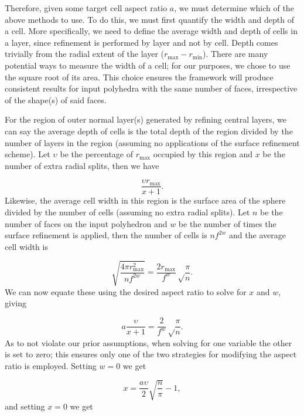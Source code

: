 Therefore, given some target cell aspect ratio $a$, we must determine which of the above methods to use.
To do this, we must first quantify the width and depth of a cell.
More specifically, we need to define the average width and depth of cells in a layer, since refinement is performed by layer and not by cell.
Depth comes trivially from the radial extent of the layer ($r_\mathrm{max} - r_\mathrm{min}$).
There are many potential ways to measure the width of a cell; for our purposes, we chose to use the square root of its area.
This choice ensures the framework will produce consistent results for input polyhedra with the same number of faces, irrespective of the shape(s) of said faces.


For the region of outer normal layer(s) generated by refining central layers, we can say the average depth of cells is the total depth of the region divided by the number of layers in the region (assuming no applications of the surface refinement scheme).
Let $\upsilon$ be the percentage of $r_\mathrm{max}$ occupied by this region and $x$ be the number of extra radial splits, then we have

\begin{equation*}
\frac{\upsilon r_\mathrm{max}}{x+1}.
\end{equation*}
%
Likewise, the average cell width in this region is the surface area of the sphere divided by the number of cells (assuming no extra radial splits).
Let $n$ be the number of faces on the input polyhedron and $w$ be the number of times the surface refinement is applied, then the number of cells is $n f^{2w}$ and the average cell width is

\begin{equation*}
\sqrt{ \frac{ 4 \pi r_\mathrm{max}^2 }{ n f^{2 w} } } = \frac{2 r_\mathrm{max}}{f^w} \sqrt\frac{\pi}{n}.
\end{equation*}
%
We can now equate these using the desired aspect ratio to solve for $x$ and $w$, giving

\begin{equation*}
a \frac{\upsilon}{x+1} = \frac{2}{f^w} \sqrt\frac{\pi}{n}.
\end{equation*}
%
As to not violate our prior assumptions, when solving for one variable the other is set to zero; this ensures only one of the two strategies for modifying the aspect ratio is employed.
Setting $w = 0$ we get

\begin{equation}
x = \frac{a \upsilon}{2} \sqrt{\frac{n}{\pi}} - 1,
\label{eq:extraSplits}
\end{equation}
%
and setting $x = 0$ we get


